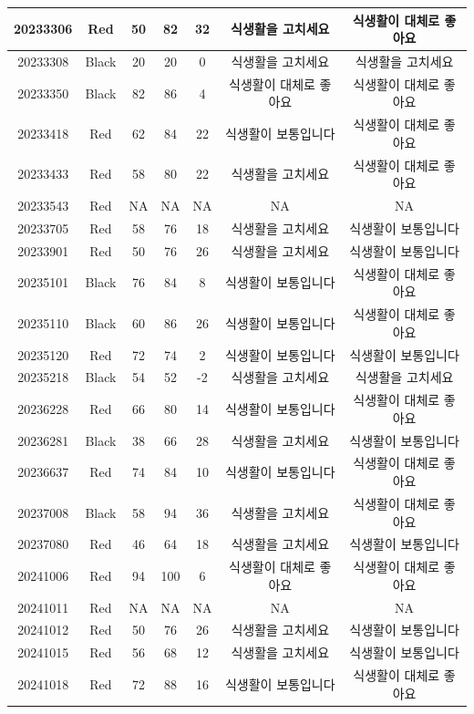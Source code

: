 \documentclass[
]{book}
\begin{document}
\begin{tabular}{c|c|c|c|c|c|c}
\hline
20233306 & Red & 50 & 82 & 32 & 식생활을 고치세요 & 식생활이 대체로 좋아요\\
\hline
20233308 & Black & 20 & 20 & 0 & 식생활을 고치세요 & 식생활을 고치세요\\
\hline
20233350 & Black & 82 & 86 & 4 & 식생활이 대체로 좋아요 & 식생활이 대체로 좋아요\\
\hline
20233418 & Red & 62 & 84 & 22 & 식생활이 보통입니다 & 식생활이 대체로 좋아요\\
\hline
20233433 & Red & 58 & 80 & 22 & 식생활을 고치세요 & 식생활이 대체로 좋아요\\
\hline
20233543 & Red & NA & NA & NA & NA & NA\\
\hline
20233705 & Red & 58 & 76 & 18 & 식생활을 고치세요 & 식생활이 보통입니다\\
\hline
20233901 & Red & 50 & 76 & 26 & 식생활을 고치세요 & 식생활이 보통입니다\\
\hline
20235101 & Black & 76 & 84 & 8 & 식생활이 보통입니다 & 식생활이 대체로 좋아요\\
\hline
20235110 & Black & 60 & 86 & 26 & 식생활이 보통입니다 & 식생활이 대체로 좋아요\\
\hline
20235120 & Red & 72 & 74 & 2 & 식생활이 보통입니다 & 식생활이 보통입니다\\
\hline
20235218 & Black & 54 & 52 & -2 & 식생활을 고치세요 & 식생활을 고치세요\\
\hline
20236228 & Red & 66 & 80 & 14 & 식생활이 보통입니다 & 식생활이 대체로 좋아요\\
\hline
20236281 & Black & 38 & 66 & 28 & 식생활을 고치세요 & 식생활이 보통입니다\\
\hline
20236637 & Red & 74 & 84 & 10 & 식생활이 보통입니다 & 식생활이 대체로 좋아요\\
\hline
20237008 & Black & 58 & 94 & 36 & 식생활을 고치세요 & 식생활이 대체로 좋아요\\
\hline
20237080 & Red & 46 & 64 & 18 & 식생활을 고치세요 & 식생활이 보통입니다\\
\hline
20241006 & Red & 94 & 100 & 6 & 식생활이 대체로 좋아요 & 식생활이 대체로 좋아요\\
\hline
20241011 & Red & NA & NA & NA & NA & NA\\
\hline
20241012 & Red & 50 & 76 & 26 & 식생활을 고치세요 & 식생활이 보통입니다\\
\hline
20241015 & Red & 56 & 68 & 12 & 식생활을 고치세요 & 식생활이 보통입니다\\
\hline
20241018 & Red & 72 & 88 & 16 & 식생활이 보통입니다 & 식생활이 대체로 좋아요\\

\end{tabular}
\end{document}
